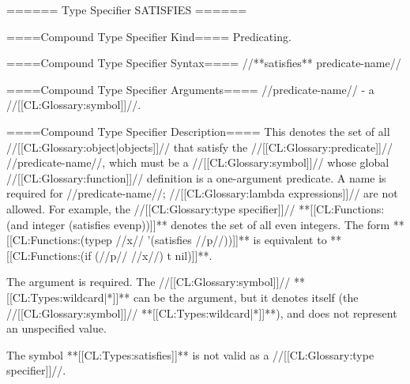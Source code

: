 ====== Type Specifier SATISFIES ======

====Compound Type Specifier Kind====
Predicating.

====Compound Type Specifier Syntax====
//**satisfies** predicate-name//

====Compound Type Specifier Arguments====
//predicate-name// - a //[[CL:Glossary:symbol]]//.

====Compound Type Specifier Description====
This denotes the set of all //[[CL:Glossary:object|objects]]// that satisfy the //[[CL:Glossary:predicate]]// //predicate-name//, which must be a //[[CL:Glossary:symbol]]// whose global //[[CL:Glossary:function]]// definition is a one-argument predicate. A name is required for //predicate-name//; //[[CL:Glossary:lambda expressions]]// are not allowed. For example, the //[[CL:Glossary:type specifier]]// **[[CL:Functions:(and integer (satisfies evenp))]]** denotes the set of all even integers. The form **[[CL:Functions:(typep //x// '(satisfies //p//))]]** is equivalent to **[[CL:Functions:(if (//p// //x//) t nil)]]**.

The argument is required. The //[[CL:Glossary:symbol]]// **[[CL:Types:wildcard|*]]** can be the argument, but it denotes itself (the //[[CL:Glossary:symbol]]// **[[CL:Types:wildcard|*]]**), and does not represent an unspecified value.

The symbol **[[CL:Types:satisfies]]** is not valid as a //[[CL:Glossary:type specifier]]//.

